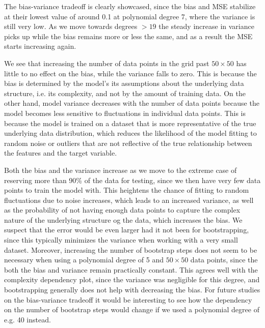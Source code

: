 \documentclass[aps,pra,english,notitlepage,reprint,nofootinbib]{revtex4-1}  %
\begin{document}
The bias-variance tradeoff is clearly showcased, since the bias and MSE stabilize at their lowest value of around 0.1 at polynomial degree 7, where the variance is still very low. As we move towards degrees $>19$ the steady increase in variance picks up while the bias remains more or less the same, and as a result the MSE starts increasing again. 

We see that increasing the number of data points in the grid past $50\times50$ has little to no effect on the bias, while the variance falls to zero. This is because the bias is determined by the model's its assumptions about the underlying data structure, i.e. its complexity, and not by the amount of training data. On the other hand, model variance decreases with the number of data points because the model becomes less sensitive to fluctuations in individual data points. This is because the model is trained on a dataset that is more representative of the true underlying data distribution, which reduces the likelihood of the model fitting to random noise or outliers that are not reflective of the true relationship between the features and the target variable. 

Both the bias and the variance increase as we move to the extreme case of reserving more than 90\% of the data for testing, since we then have very few data points to train the model with. This heightens the chance of fitting to random fluctuations due to noise increases, which leads to an increased variance, as well as the probability of not having enough data points to capture the complex nature of the underlying structure og the data, which increases the bias. We suspect that the error would be even larger had it not been for bootstrapping, since this typically minimizes the variance when working with a very small dataset. Moreover, increasing the number of bootstrap steps does not seem to be necessary when using a polynomial degree of 5 and $50\times50$ data points, since the both the bias and variance remain practically constant. This agrees well with the complexity dependency plot, since the variance was negligible for this degree, and bootstrapping generally does not help with decreasing the bias. For future studies on the bias-variance tradeoff it would be interesting to see how the dependency on the number of bootstrap steps would change if we used a polynomial degree of e.g. 40 instead. 
\end{document}
